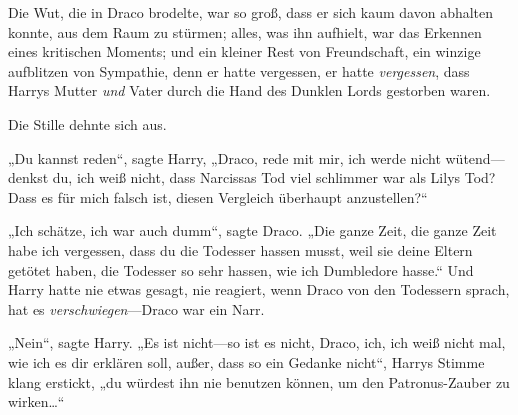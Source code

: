 Die Wut, die in Draco brodelte, war so groß, dass er sich kaum davon abhalten konnte, aus dem Raum zu stürmen; alles, was ihn aufhielt, war das Erkennen eines kritischen Moments; und ein kleiner Rest von Freundschaft, ein winzige aufblitzen von Sympathie, denn er hatte vergessen, er hatte \emph{vergessen}, dass Harrys Mutter \emph{und} Vater durch die Hand des Dunklen Lords gestorben waren.

Die Stille dehnte sich aus.

„Du kannst reden“, sagte Harry, „Draco, rede mit mir, ich werde nicht wütend—denkst du, ich weiß nicht, dass Narcissas Tod viel schlimmer war als Lilys Tod? Dass es für mich falsch ist, diesen Vergleich überhaupt anzustellen?“

„Ich schätze, ich war auch dumm“, sagte Draco. „Die ganze Zeit, die ganze Zeit habe ich vergessen, dass du die Todesser hassen musst, weil sie deine Eltern getötet haben, die Todesser so sehr hassen, wie ich Dumbledore hasse.“ Und Harry hatte nie etwas gesagt, nie reagiert, wenn Draco von den Todessern sprach, hat es \emph{verschwiegen}—Draco war ein Narr.

„Nein“, sagte Harry. „Es ist nicht—so ist es nicht, Draco, ich, ich weiß nicht mal, wie ich es dir erklären soll, außer, dass so ein Gedanke nicht“, Harrys Stimme klang erstickt, „du würdest ihn nie benutzen können, um den Patronus-Zauber zu wirken…“

